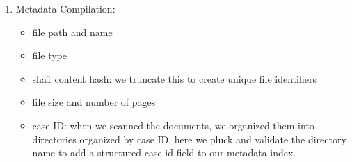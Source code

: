 \documentclass{article}
\begin{document}
\begin{enumerate}
    \item Metadata Compilation:
    \begin{itemize}
        \item file path and name
        \item file type
        \item sha1 content hash: we truncate this to create unique file identifiers
        \item file size and number of pages
        \item case ID: when we scanned the documents, we organized them into directories organized by case ID, here we pluck and validate the directory name to add a structured case id field to our metadata index.
    \end{itemize}
    

\end{enumerate}
\end{document}
